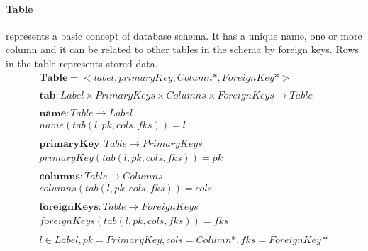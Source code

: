 \documentclass[11pt]{article}
\begin{document}
\paragraph{Table} represents a basic concept of database schema. It has a unique name, one or more column and it can be related to other tables in the schema by foreign keys. Rows in the table represents stored data.
\begin{align*}
	\mathbf{Table} = <label, primaryKey, Column*, ForeignKey*>\\ \\
	\mathbf{tab} 	: Label \times PrimaryKeys \times Columns \times ForeignKeys \rightarrow Table \\ \\
	\mathbf{name} : Table \rightarrow Label  \\
	name(tab(l, pk, cols, fks)) = l \\ \\
	\mathbf{primaryKey} : Table \rightarrow PrimaryKeys  \\
	primaryKey(tab(l, pk, cols, fks)) = pk \\ \\
	\mathbf{columns} : Table \rightarrow Columns  \\
	columns(tab(l, pk, cols, fks)) = cols \\ \\
	\mathbf{foreignKeys} : Table \rightarrow ForeignKeys  \\
	foreignKeys(tab(l, pk, cols, fks)) = fks \\ \\
l \in Label, pk = PrimaryKey, cols = Column*, fks = ForeignKey*
\end{align*}
\end{document}
